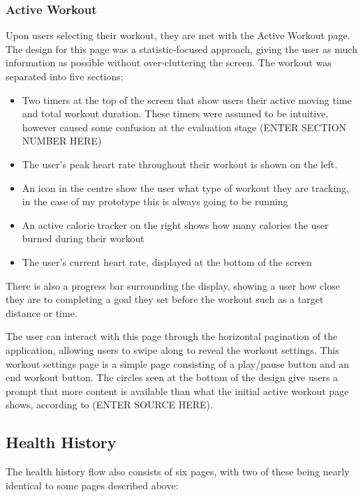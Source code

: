 \documentclass{l4proj}
\begin{document}
\subsubsection{Active Workout}

Upon users selecting their workout, they are met with the Active Workout page. The design for this page was a statistic-focused approach, giving the user as much information as possible without over-cluttering the screen. The workout was separated into five sections:

\begin{itemize}
    \item Two timers at the top of the screen that show users their active moving time and total workout duration. These timers were assumed to be intuitive, however caused some confusion at the evaluation stage (ENTER SECTION NUMBER HERE)
    \item The user’s peak heart rate throughout their workout is shown on the left.
    \item An icon in the centre show the user what type of workout they are tracking, in the case of my prototype this is always going to be running
    \item An active calorie tracker on the right shows how many calories the user burned during their workout
    \item The user’s current heart rate, displayed at the bottom of the screen
\end{itemize}

There is also a progress bar surrounding the display, showing a user how close they are to completing a goal they set before the workout such as a target distance or time.

The user can interact with this page through the horizontal pagination of the application, allowing users to swipe along to reveal the workout settings. This workout settings page is a simple page consisting of a play/pause button and an end workout button. The circles seen at the bottom of the design give users a prompt that more content is available than what the initial active workout page shows, according to (ENTER SOURCE HERE). 

\subsection{Health History}

The health history flow also consists of six pages, with two of these being nearly identical to some pages described above:
\end{document}
